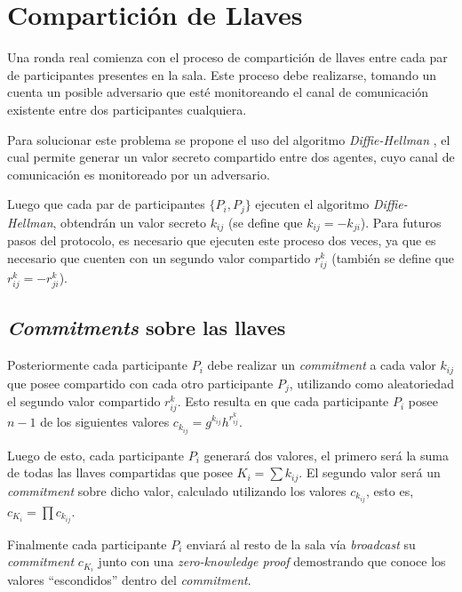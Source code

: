 
\section{Compartición de Llaves}

Una ronda real comienza con el proceso de compartición de llaves entre cada 
par de participantes presentes en la sala. Este proceso debe realizarse, 
tomando un cuenta un posible adversario que esté monitoreando el canal de 
comunicación existente entre dos participantes cualquiera.

Para solucionar este problema se propone el uso del algoritmo 
\emph{Diffie-Hellman} \cite{diffie1976new}, el cual permite generar un valor 
secreto compartido entre dos agentes, cuyo canal de comunicación es 
monitoreado por un adversario.

Luego que cada par de participantes $\{P_i, P_j\}$ ejecuten el algoritmo 
\emph{Diffie-Hellman}, obtendrán un valor secreto $k_{ij}$ (se define que $k_{ij} = -k_{ji}$). 
Para futuros pasos 
del protocolo, es necesario que ejecuten este proceso dos veces, ya que es 
necesario que cuenten con un segundo valor compartido $r^k_{ij}$ (también se define 
que $r^k_{ij} = -r^k_{ji}$).

\subsection{\emph{Commitments} sobre las llaves}

Posteriormente cada participante $P_i$ debe realizar un \emph{commitment} a 
cada valor $k_{ij}$ que posee compartido con cada otro participante $P_j$, 
utilizando como aleatoriedad el segundo valor compartido $r^k_{ij}$. Esto 
resulta en que cada participante $P_i$ posee $n - 1$ de los siguientes valores 
$c_{k_{ij}} = g^{k_{ij}} h^{r^k_{ij}}$.

Luego de esto, cada participante $P_i$ generará dos valores, el primero será 
la suma de todas las llaves compartidas que posee $K_i = \sum k_{ij}$. El 
segundo valor será un \emph{commitment} sobre dicho valor, calculado utilizando 
los valores $c_{k_{ij}}$, esto es, 
$c_{K_i} = \prod c_{k_{ij}}$.

Finalmente cada participante $P_i$ enviará al resto de la sala vía 
\emph{broadcast} su \emph{commitment} $c_{K_i}$ junto con una 
\emph{zero-knowledge proof} demostrando que conoce los valores ``escondidos'' 
dentro del \emph{commitment}.

